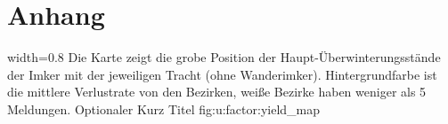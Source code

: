 \section{Anhang}











{width=0.8\textwidth} %
{Die Karte zeigt die grobe Position der Haupt-Überwinterungsstände der Imker mit der jeweiligen Tracht (ohne Wanderimker). Hintergrundfarbe ist die mittlere Verlustrate von den Bezirken, weiße Bezirke haben weniger als 5 Meldungen.} %
{Optionaler Kurz Titel} %
{fig:u:factor:yield_map} %